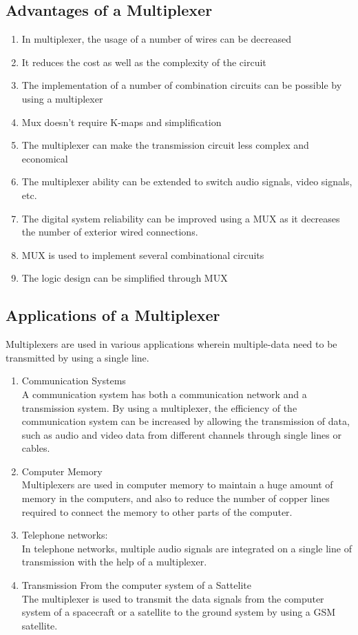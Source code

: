 \documentclass[11pt]{article}
\begin{document}
\subsection{Advantages of a Multiplexer}
\begin{enumerate}
	\item In multiplexer, the usage of a number of wires can be decreased
	\item It reduces the cost as well as the complexity of the circuit
	\item The implementation of a number of combination circuits can be possible by using a multiplexer
	\item Mux doesn't require K-maps and simplification
	\item The multiplexer can make the transmission circuit less complex and economical
	\item The multiplexer ability can be extended to switch audio signals, video signals, etc.
	\item The digital system reliability can be improved using a MUX as it decreases the number of exterior wired connections.
	\item MUX is used to implement several combinational circuits
	\item The logic design can be simplified through MUX
\end{enumerate}
\subsection{Applications of a Multiplexer}

Multiplexers are used in various applications wherein multiple-data need to be transmitted by using a single line.
\begin{enumerate}
	\item Communication Systems \\
	      A communication system has both a communication network and a transmission system. By using a multiplexer, the efficiency of the communication system can be increased by allowing the transmission of data, such as audio and video data from different channels through single lines or cables.

	\item Computer Memory \\Multiplexers are used in computer memory to maintain a huge amount of memory in the computers, and also to reduce the number of copper lines required to connect the memory to other parts of the computer.

	\item Telephone networks:  \\
	      In telephone networks, multiple audio signals are integrated on a single line of transmission with the help of a multiplexer.

	\item Transmission From the computer system of a Sattelite \\
	      The multiplexer is used to transmit the data signals from the computer system of a spacecraft or a satellite to the ground system by using a GSM satellite.

\end{enumerate}
\end{document}
